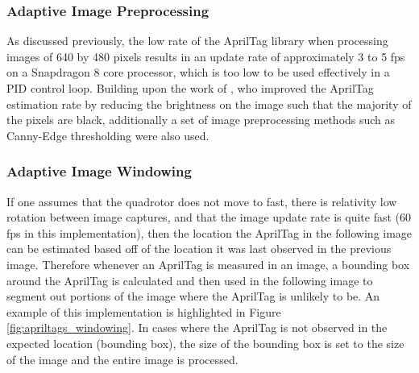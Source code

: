 \documentclass[11pt, twocolumn]{article}
\begin{document}
\subsubsection{Adaptive Image Preprocessing}

As discussed previously, the low rate of the AprilTag library when processing images of 640 by 480 pixels results in an update rate of approximately 3 to 5 fps on a Snapdragon 8 core processor, which is too low to be used effectively in a PID control loop. Building upon the work of \cite{Ling2014}, who improved the AprilTag estimation rate by reducing the brightness on the image such that the majority of the pixels are black, additionally a set of image preprocessing methods such as Canny-Edge thresholding were also used. 

\subsubsection{Adaptive Image Windowing}

If one assumes that the quadrotor does not move to fast, there is relativity low rotation between image captures, and that the image update rate is quite fast (60 fps in this implementation), then the location the AprilTag in the following image can be estimated based off of the location it was last observed in the previous image. Therefore whenever an AprilTag is measured in an image, a bounding box around the AprilTag is calculated and then used in the following image to segment out portions of the image where the AprilTag is unlikely to be. An example of this implementation is highlighted in Figure \ref{fig:apriltags_windowing}. In cases where the AprilTag is not observed in the expected location (bounding box), the size of the bounding box is set to the size of the image and the entire image is processed. 
\end{document}

